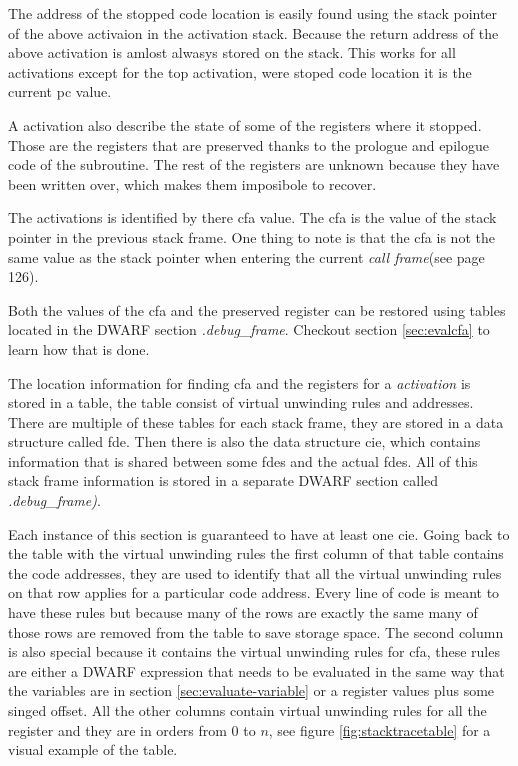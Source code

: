 The address of the stopped code location is easily found using the stack pointer of the above activaion in the activation stack.
Because the return address of the above activation is amlost alwasys stored on the stack.
This works for all activations except for the top activation, were stoped code location it is the current \gls{pc} value.


A activation also describe the state of some of the registers where it stopped.
Those are the registers that are preserved thanks to the prologue and epilogue code of the subroutine.
The rest of the registers are unknown because they have been written over, which makes them imposibole to recover.


The activations is identified by there \gls{cfa} value. 
The \gls{cfa} is the value of the stack pointer in the previous stack frame.
One thing to note is that the \gls{cfa} is not the same value as the stack pointer when entering the current \emph{call frame}(see \cite{dwarf} page 126).


Both the values of the \gls{cfa} and the preserved register can be restored using tables located in the \gls{DWARF} section \emph{.debug\_frame}.
Checkout section \ref{sec:evalcfa} to learn how that is done.



 \label{sec:evalcfa}
The location information for finding \gls{cfa} and the registers for a \emph{activation} is stored in a table, the table consist of virtual unwinding rules and addresses.
There are multiple of these tables for each stack frame, they are stored in a data structure called \gls{fde}.
Then there is also the data structure \gls{cie}, which contains information that is shared between some \glspl{fde} and the actual \glspl{fde}.
All of this stack frame information is stored in a separate \gls{DWARF} section called \emph{.debug\_frame)}.

Each instance of this section is guaranteed to have at least one \acrlong{cie}.
Going back to the table with the virtual unwinding rules the first column of that table contains the code addresses, they are used to identify that all the virtual unwinding rules on that row applies for a particular code address.
Every line of code is meant to have these rules but because many of the rows are exactly the same many of those rows are removed from the table to save storage space.
The second column is also special because it contains the virtual unwinding rules for \gls{cfa}, these rules are either a \gls{DWARF} expression that needs to be evaluated in the same way that the variables are in section \ref{sec:evaluate-variable} or a register values plus some singed offset.
All the other columns contain virtual unwinding rules for all the register and they are in orders from $0$ to $n$, see figure \ref{fig:stacktracetable} for a visual example of the table.


